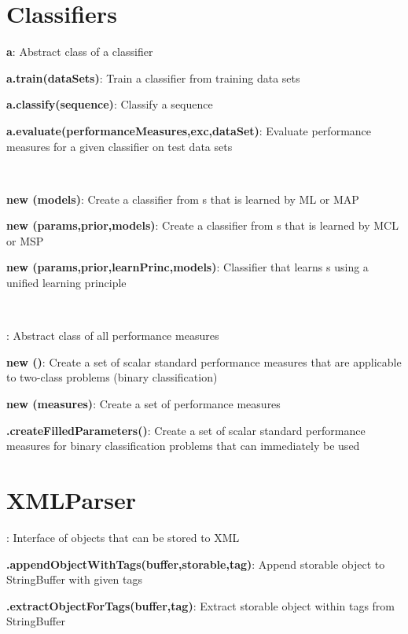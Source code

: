 \documentclass[10pt]{scrartcl}
\newcommand{\entry}[3]{{\bfseries #1#2}: #3}
\begin{document}
\begin{flushleft}
\section{Classifiers}

\entry{\AbstractClassifier}{ a}{Abstract class of a classifier}

\entry{a}{.train(dataSets)}{Train a classifier from training data sets}

\entry{a}{.classify(sequence)}{Classify a sequence}

\entry{a}{.evaluate(performanceMeasures,exc,dataSet)}{Evaluate performance measures for a given classifier on test data sets}

~

\entry{new \TrainSMBasedClassifier}{(models)}{Create a classifier from \TrainSM s that is learned by ML or MAP}

\entry{new \MSPClassifier}{(params,prior,models)}{Create a classifier from \DiffSM s that is learned by MCL or MSP}

\entry{new \GenDisMixClassifier}{(params,prior,learnPrinc,models)}{Classifier that learns \DiffSM s using a unified learning principle}

~

\entry{\AbstractPerformanceMeasure}{}{Abstract class of all performance measures}

\entry{new \NumericalPerformanceMeasureParameterSet}{()}{Create a set of scalar standard performance measures that are applicable to two-class problems (binary classification)}

\entry{new \PerformanceMeasureParameterSet}{(measures)}{Create a set of performance measures}

\entry{\PerformanceMeasureParameterSet}{.createFilledParameters()}{Create a set of scalar standard performance measures for binary classification problems that can immediately be used}

\section{XMLParser}

\entry{\Storable}{}{Interface of objects that can be stored to XML}

\entry{\XMLParser}{.appendObjectWithTags(buffer,storable,tag)}{Append storable object to StringBuffer with given tags}

\entry{\XMLParser}{.extractObjectForTags(buffer,tag)}{Extract storable object within tags from StringBuffer}


\end{flushleft}
\end{document}
